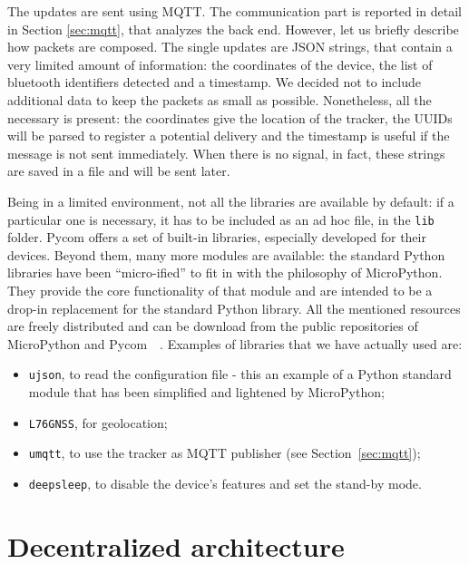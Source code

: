 The updates are sent using MQTT. The communication part is reported in detail in Section \ref{sec:mqtt}, that analyzes the back end. However, let us briefly describe how packets are composed. The single updates are JSON strings, that contain a very limited amount of information: the coordinates of the device, the list of bluetooth identifiers detected and a timestamp. We decided not to include additional data to keep the packets as small as possible. Nonetheless, all the necessary is present: the coordinates give the location of the tracker, the UUIDs will be parsed to register a potential delivery and the timestamp is useful if the message is not sent immediately. When there is no signal, in fact, these strings are saved in a file and will be sent later. 

Being in a limited environment, not all the libraries are available by default: if a particular one is necessary, it has to be included as an ad hoc file, in the \texttt{lib} folder. Pycom offers a set of built-in libraries, especially developed for their devices. Beyond them, many more modules are available: the standard Python libraries have been ``micro-ified'' to fit in with the philosophy of MicroPython. They provide the core functionality of that module and are intended to be a drop-in replacement for the standard Python library. All the mentioned resources are freely distributed and can be download from the public repositories of  MicroPython and Pycom~\cite{micropy_repo}~\cite{pycom_repo}. Examples of libraries that we have actually used are:
\begin{itemize}
    \item \texttt{ujson}, to read the configuration file - this an example of a Python standard module that has been simplified and lightened by MicroPython;
    \item \texttt{L76GNSS}, for geolocation;
    \item \texttt{umqtt}, to use the tracker as MQTT publisher (see Section~\ref{sec:mqtt});
    \item \texttt{deepsleep}, to disable the device's features and set the stand-by mode.
\end{itemize}

\chapter{Decentralized architecture}
\label{sec:arch}

